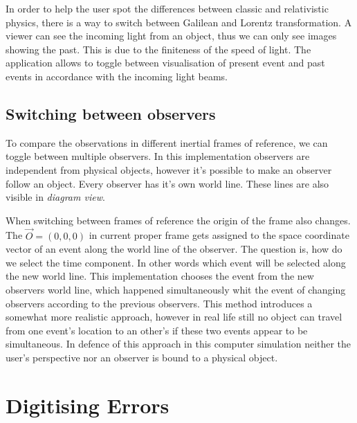 \documentclass{egpubl}
\begin{document}
In order to help the user spot the differences between classic and relativistic physics, there is a way to switch between Galilean \cite{KHGalilei} and Lorentz transformation. A viewer can see the incoming light from an object, thus we can only see images showing the past. This is due to the finiteness of the speed of light. The application allows to toggle between visualisation of present event and past events in accordance with the incoming light beams.

\subsection{Switching between observers}
To compare the observations in different inertial frames of reference, we can toggle between multiple observers. In this implementation observers are independent from physical objects, however it's possible to make an observer follow an object. Every observer has it's own world line. These lines are also visible in \emph{diagram view}.

When switching between frames of reference the origin of the frame also changes. The $\vec{O} =(0,0,0)$ in current proper frame gets assigned to the space coordinate vector of an event along the world line of the observer. The question is, how do we select the time component. In other words which event will be selected along the new world line. This implementation chooses the event from the new observers world line, which happened simultaneously whit the event of changing observers according to the previous observers. This method introduces a somewhat more realistic approach, however in real life still no object can travel from one event's location to an other's if these two events appear to be simultaneous. In defence of this approach in this computer simulation neither the user's perspective nor an observer is bound to a physical object.

\begin{figure}[hbp]
\end{figure}







\section{Digitising Errors}
\label{sec:digErr}
\end{document}
